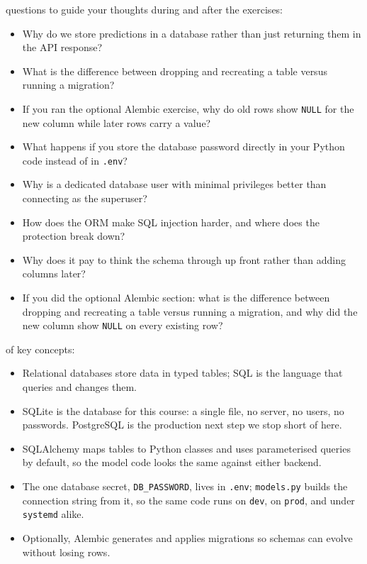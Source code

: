  questions to guide your thoughts during and after the exercises:
\begin{itemize}
    \item Why do we store predictions in a database rather than just returning them in the API response?
    \item What is the difference between dropping and recreating a table versus running a migration?
    \item If you ran the optional Alembic exercise, why do old rows show \texttt{NULL} for the new column while later rows carry a value?
    \item What happens if you store the database password directly in your Python code instead of in \texttt{.env}?
    \item Why is a dedicated database user with minimal privileges better than connecting as the superuser?
    \item How does the ORM make SQL injection harder, and where does the protection break down?
    \item Why does it pay to think the schema through up front rather than adding columns later?
    \item If you did the optional Alembic section: what is the difference between dropping and recreating a table versus running a migration, and why did the new column show \texttt{NULL} on every existing row?
\end{itemize}

 of key concepts:
\begin{itemize}
    \item Relational databases store data in typed tables; SQL is the language that queries and changes them.
    \item SQLite is the database for this course: a single file, no server, no users, no passwords. PostgreSQL is the production next step we stop short of here.
    \item SQLAlchemy maps tables to Python classes and uses parameterised queries by default, so the model code looks the same against either backend.
    \item The one database secret, \texttt{DB\_PASSWORD}, lives in \texttt{.env}; \texttt{models.py} builds the connection string from it, so the same code runs on \texttt{dev}, on \texttt{prod}, and under \texttt{systemd} alike.
    \item Optionally, Alembic generates and applies migrations so schemas can evolve without losing rows.
\end{itemize}

